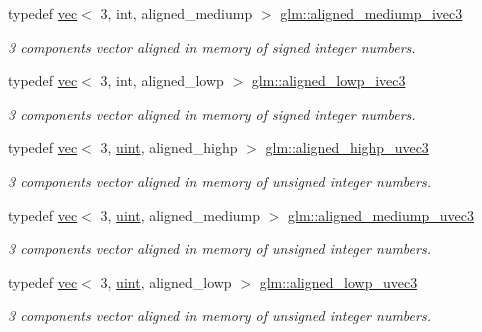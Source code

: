 \begin{DoxyCompactItemize}
typedef \hyperlink{structglm_1_1vec}{vec}$<$ 3, int, aligned\+\_\+mediump $>$ \hyperlink{group__gtc__type__aligned_gad835ac79ecdcae8d6292b37656f54973}{glm\+::aligned\+\_\+mediump\+\_\+ivec3}
\begin{DoxyCompactList}\small\item\em 3 components vector aligned in memory of signed integer numbers. \end{DoxyCompactList}\item 
typedef \hyperlink{structglm_1_1vec}{vec}$<$ 3, int, aligned\+\_\+lowp $>$ \hyperlink{group__gtc__type__aligned_ga2862680efddc950ffe37245cb49dd960}{glm\+::aligned\+\_\+lowp\+\_\+ivec3}
\begin{DoxyCompactList}\small\item\em 3 components vector aligned in memory of signed integer numbers. \end{DoxyCompactList}\item 
typedef \hyperlink{structglm_1_1vec}{vec}$<$ 3, \hyperlink{group__core__precision_ga4fd29415871152bfb5abd588334147c8}{uint}, aligned\+\_\+highp $>$ \hyperlink{group__gtc__type__aligned_ga1d303644825af6267389d6405f490ddc}{glm\+::aligned\+\_\+highp\+\_\+uvec3}
\begin{DoxyCompactList}\small\item\em 3 components vector aligned in memory of unsigned integer numbers. \end{DoxyCompactList}\item 
typedef \hyperlink{structglm_1_1vec}{vec}$<$ 3, \hyperlink{group__core__precision_ga4fd29415871152bfb5abd588334147c8}{uint}, aligned\+\_\+mediump $>$ \hyperlink{group__gtc__type__aligned_ga5d37a008051d20c6079933f0680b6521}{glm\+::aligned\+\_\+mediump\+\_\+uvec3}
\begin{DoxyCompactList}\small\item\em 3 components vector aligned in memory of unsigned integer numbers. \end{DoxyCompactList}\item 
typedef \hyperlink{structglm_1_1vec}{vec}$<$ 3, \hyperlink{group__core__precision_ga4fd29415871152bfb5abd588334147c8}{uint}, aligned\+\_\+lowp $>$ \hyperlink{group__gtc__type__aligned_gadaa291d4c8716193c6294d6e711eb071}{glm\+::aligned\+\_\+lowp\+\_\+uvec3}
\begin{DoxyCompactList}\small\item\em 3 components vector aligned in memory of unsigned integer numbers. \end{DoxyCompactList}\item 

\end{DoxyCompactItemize}
